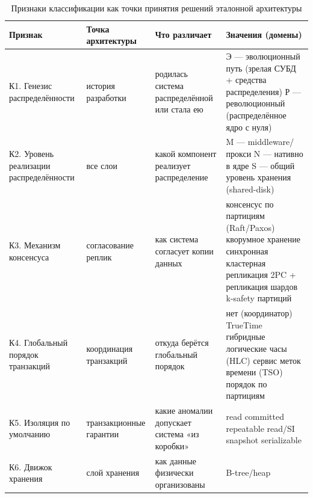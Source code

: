 \documentclass{misisarticle}
\begin{document}
\begin{table}[t]
\caption{Признаки классификации как точки принятия решений эталонной архитектуры}\label{tab:axes}
\centering
\small
\renewcommand{\arraystretch}{1.15}
\begin{tabular}{>{\raggedright\arraybackslash}p{2.7cm}>{\raggedright\arraybackslash}p{3.1cm}>{\raggedright\arraybackslash}p{4.3cm}>{\raggedright\arraybackslash}p{5.3cm}}
\toprule
\textbf{Признак} & \textbf{Точка архитектуры} & \textbf{Что различает} & \textbf{Значения (домены)} \\
\midrule
К1. Генезис распределённости & история разработки & родилась система распределённой или стала ею &
Э --- эволюционный путь (зрелая СУБД + средства распределения) \newline
Р --- революционный (распределённое ядро с нуля) \\
\addlinespace
К2. Уровень реализации распределённости & все слои & какой компонент реализует распределение &
M --- middleware/прокси \newline
N --- нативно в ядре \newline
S --- общий уровень хранения (shared-disk) \\
\addlinespace
К3. Механизм консенсуса & согласование реплик & как система согласует копии данных &
консенсус по партициям (Raft/Paxos) \newline
кворумное хранение \newline
синхронная кластерная репликация \newline
2PC + репликация шардов \newline
k-safety партиций \\
\addlinespace
К4. Глобальный порядок транзакций & координация транзакций & откуда берётся глобальный порядок &
нет (координатор) \newline
TrueTime \newline
гибридные логические часы (HLC) \newline
сервис меток времени (TSO) \newline
порядок по партициям \\
\addlinespace
К5. Изоляция по умолчанию & транзакционные гарантии & какие аномалии допускает система «из коробки» &
read committed \newline
repeatable read/SI \newline
snapshot \newline
serializable \\
\addlinespace
К6. Движок хранения & слой хранения & как данные физически организованы &
B-tree/heap \newline

\end{tabular}
\end{table}
\end{document}
